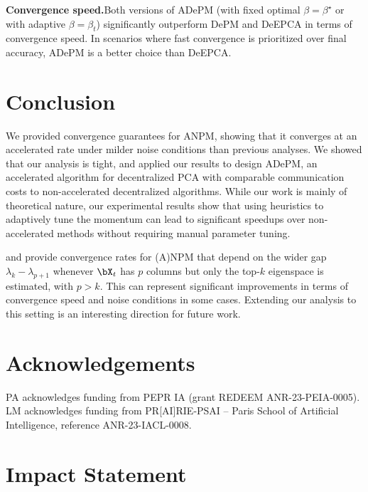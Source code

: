 \documentclass{article}
\theoremstyle{plain}
\theoremstyle{definition}
\theoremstyle{remark}
\begin{document}
\textbf{Convergence speed.}\quad Both versions of ADePM (with fixed optimal $\beta=\beta^\star$ or with adaptive $\beta = \beta_t$) significantly outperform DePM and DeEPCA in terms of convergence speed. In scenarios where fast convergence is prioritized over final accuracy, ADePM is a better choice than DeEPCA.




\section{Conclusion}

We provided convergence guarantees for ANPM, showing that it converges at an accelerated rate under milder noise conditions than previous analyses. We showed that our analysis is tight, and applied our results to design ADePM, an accelerated algorithm for decentralized PCA with comparable communication costs to non-accelerated decentralized algorithms. While our work is mainly of theoretical nature, our experimental results show that using heuristics to adaptively tune the momentum can lead to significant speedups over non-accelerated methods without requiring manual parameter tuning.

\citet{balcan2016} and \citet{xu2023anpm} provide convergence rates for (A)NPM that depend on the wider gap $\lambda_k-\lambda_{p+1}$ whenever $\bX_t$ has $p$ columns but only the top-$k$ eigenspace is estimated, with $p>k$. This can represent significant improvements in terms of convergence speed and noise conditions in some cases. Extending our analysis to this setting is an interesting direction for future work.

\section*{Acknowledgements}

PA acknowledges funding from PEPR IA (grant REDEEM ANR-23-PEIA-0005). LM acknowledges funding from PR[AI]RIE-PSAI – Paris School of Artificial Intelligence, reference ANR-23-IACL-0008.


\section*{Impact Statement}
\end{document}
